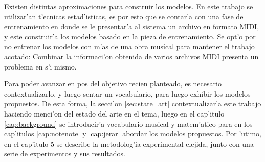 Existen distintas aproximaciones para construir los modelos.  En este trabajo se utilizar'an t'ecnicas estad'isticas, es por esto que se contar'a 
con una fase de entrenamiento en donde se le presentar'a al sistema un archivo en formato MIDI, y este construir'a los modelos basado en la pieza 
de entrenamiento. Se opt'o por no entrenar los modelos con m'as de una obra musical para mantener el trabajo acotado: Combinar la informaci'on obtenida
de varios archivos MIDI presenta un problema en s'i mismo.

Para poder avanzar en pos del objetivo recien planteado, es necesario contextualizarlo, y luego sentar un vocabulario, para luego exhibir los
modelos propuestos. De esta forma, la secci'on \ref{sec:state_art} contextualizar'a este trabajo haciendo menci'on del estado del arte 
en el tema, luego en el cap'itulo \ref{cap:background} se introducir'a vocabulario musical y matem'atico 
para en los cap'itulos \ref{cap:notenote} y \ref{cap:jerar} abordar los modelos propuestos. Por 'utimo, en el cap'itulo 5 se describe la metodolog'ia
experimental elejida, junto con una serie de experimentos y sus resultados.

